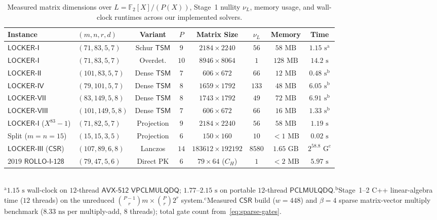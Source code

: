 \documentclass[11pt,a4paper]{article}
\theoremstyle{definition}
\theoremstyle{remark}
\newcommand{\Ftwo}{\mathbb{F}_2}
\newcommand{\TSM}{\mathsf{TSM}}
\begin{document}
\begin{table}[t]
\centering
\small
\caption{Measured matrix dimensions over $L = \Ftwo[X]/(P(X))$, Stage~1 nullity $\nu_L$, memory usage, and wall-clock runtimes across our implemented solvers.}
\label{tab:measured}
\setlength{\tabcolsep}{3.2pt}
\begin{tabular}{@{}llcccccc@{}}
\toprule
\textbf{Instance} & \textbf{$(m, n, r, d)$} & \textbf{Variant} & \textbf{$P$} & \textbf{Matrix Size} & \textbf{$\nu_L$} & \textbf{Memory} & \textbf{Time} \\
\midrule
$\mathsf{LOCKER\text{-}I}$ & $(71, 83, 5, 7)$ & Schur $\TSM$ & $9$ & $2184 \times 2240$ & $56$ & $58\text{ MB}$ & $1.15\text{ s}^{\mathrm{a}}$ \\
$\mathsf{LOCKER\text{-}I}$ & $(71, 83, 5, 7)$ & Overdet. & $10$ & $8946 \times 8064$ & $1$ & $128\text{ MB}$ & $14.2\text{ s}$ \\
$\mathsf{LOCKER\text{-}II}$ & $(101, 83, 5, 7)$ & Dense $\TSM$ & $7$ & $606 \times 672$ & $66$ & $12\text{ MB}$ & $0.48\text{ s}^{\mathrm{b}}$ \\
$\mathsf{LOCKER\text{-}IV}$ & $(79, 101, 5, 7)$ & Dense $\TSM$ & $8$ & $1659 \times 1792$ & $133$ & $48\text{ MB}$ & $6.05\text{ s}^{\mathrm{b}}$ \\
$\mathsf{LOCKER\text{-}VII}$ & $(83, 149, 5, 8)$ & Dense $\TSM$ & $8$ & $1743 \times 1792$ & $49$ & $72\text{ MB}$ & $6.91\text{ s}^{\mathrm{b}}$ \\
$\mathsf{LOCKER\text{-}VIII}$ & $(101, 149, 5, 8)$ & Dense $\TSM$ & $7$ & $606 \times 672$ & $66$ & $16\text{ MB}$ & $1.33\text{ s}^{\mathrm{b}}$ \\
$\mathsf{LOCKER\text{-}I}$ ($X^{83}{-}1$) & $(71, 82, 5, 7)$ & Projection & $9$ & $2184 \times 2240$ & $56$ & $58\text{ MB}$ & $1.19\text{ s}$ \\
Split ($m{=}n{=}15$) & $(15, 15, 3, 5)$ & Projection & $6$ & $150 \times 160$ & $10$ & $<1\text{ MB}$ & $0.02\text{ s}$ \\
$\mathsf{LOCKER\text{-}III}$ ($\mathsf{CSR}$) & $(107, 89, 6, 8)$ & Lanczos & $14$ & $183612 \times 192192$ & $8580$ & $1.65\text{ GB}$ & $2^{58.8}\text{ G}^{\mathrm{c}}$ \\
$2019$ $\mathsf{ROLLO\text{-}I\text{-}128}$ & $(79, 47, 5, 6)$ & Direct PK & $6$ & $79 \times 64$ ($C_H$) & $1$ & $<2\text{ MB}$ & $5.97\text{ s}$ \\
\bottomrule
\end{tabular}
\\[0.3em]
{\scriptsize $^{\mathrm{a}}$$1.15\text{ s}$ wall-clock on $12$-thread $\mathsf{AVX\text{-}512}$ $\mathsf{VPCLMULQDQ}$; $1.77\text{--}2.15\text{ s}$ on portable $12$-thread $\mathsf{PCLMULQDQ}$.\quad $^{\mathrm{b}}$Stage~1--2 C++ linear-algebra time ($12$ threads) on the unreduced $\binom{P-1}{r}m \times \binom{P}{r}2^r$ system.\quad $^{\mathrm{c}}$Measured $\mathsf{CSR}$ build ($w = 448$) and $\beta = 4$ sparse matrix-vector multiply benchmark ($8.33\text{ ns}$ per multiply-add, $8$ threads); total gate count from~\eqref{eq:sparse-gates}.}
\end{table}
\end{document}
